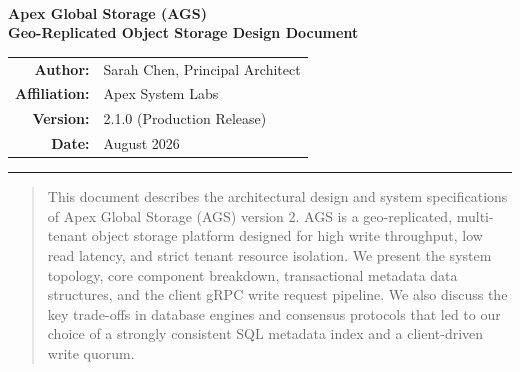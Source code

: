 \documentclass[11pt, a4paper]{article}
\begin{document}
\begin{center}
    \sffamily
    \hfill \\
    \vspace{1.5em}
    {\Huge\bfseries\color{primary}Apex Global Storage (AGS)} \\
    \vspace{0.5em}
    {\Large\bfseries\color{secondary}Geo-Replicated Object Storage Design Document} \\
    \vspace{1.5em}
    \begin{tabular}{rl}
        \textbf{Author:} & Sarah Chen, Principal Architect \\
        \textbf{Affiliation:} & Apex System Labs \\
        \textbf{Version:} & 2.1.0 (Production Release) \\
        \textbf{Date:} & August 2026
    \end{tabular}
    \vspace{2.0em}
    {\color{rulecolor}\hrule height 1pt}
\end{center}

\vspace{1.0em}

\begin{abstract}
    This document describes the architectural design and system specifications of Apex Global Storage (AGS) version 2. AGS is a geo-replicated, multi-tenant object storage platform designed for high write throughput, low read latency, and strict tenant resource isolation. We present the system topology, core component breakdown, transactional metadata data structures, and the client gRPC write request pipeline. We also discuss the key trade-offs in database engines and consensus protocols that led to our choice of a strongly consistent SQL metadata index and a client-driven write quorum.
\end{abstract}

\vspace{1.5em}
\tableofcontents
\vspace{2.0em}






\vspace{1.5em}
\nocite{*}


\end{document}
